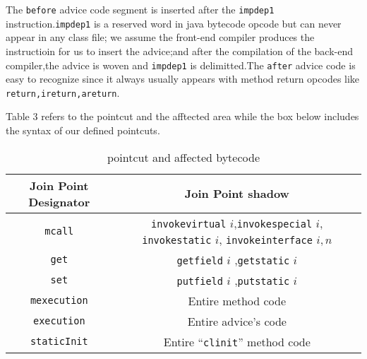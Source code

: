 The \texttt{before} advice code segment is inserted after the \texttt{impdep1} instruction.\texttt{impdep1} is a reserved word in java bytecode opcode but can never appear in any class file; we assume the front-end compiler produces the instructioin for us to insert the advice;and after the compilation of the back-end compiler,the advice is woven and \texttt{impdep1} is delimitted.The \texttt{after} advice code is easy to recognize since it always usually appears with method return opcodes like \texttt{return,ireturn,areturn}.

Table 3 refers to the pointcut and the afftected area while the box below includes the syntax of our defined pointcuts.

\begin{table}
\centering
\begin{tabular}{|c|c|}
\hline Join Point Designator  & Join Point shadow\\
\hline \texttt{mcall}  & \texttt{invokevirtual} $i$,\texttt{invokespecial} $i$, \texttt{invokestatic} $i$, \texttt{invokeinterface} $i,n$\\
\hline \texttt{get} & \texttt{getfield} $i$ ,\texttt{getstatic} $i$\\
\hline \texttt{set} & \texttt{putfield} $i$ ,\texttt{putstatic} $i$\\
\hline \texttt{mexecution} & Entire method code\\
\hline \texttt{execution} & Entire advice's code\\
\hline \texttt{staticInit} & Entire ``\texttt{clinit}'' method code\\
\hline
 \end{tabular}
\caption{pointcut and affected bytecode}
\end{table}

